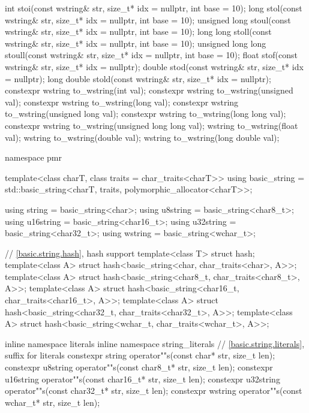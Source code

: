 \begin{codeblock}
{  int stoi(const wstring& str, size_t* idx = nullptr, int base = 10);
  long stol(const wstring& str, size_t* idx = nullptr, int base = 10);
  unsigned long stoul(const wstring& str, size_t* idx = nullptr, int base = 10);
  long long stoll(const wstring& str, size_t* idx = nullptr, int base = 10);
  unsigned long long stoull(const wstring& str, size_t* idx = nullptr, int base = 10);
  float stof(const wstring& str, size_t* idx = nullptr);
  double stod(const wstring& str, size_t* idx = nullptr);
  long double stold(const wstring& str, size_t* idx = nullptr);
  constexpr wstring to_wstring(int val);
  constexpr wstring to_wstring(unsigned val);
  constexpr wstring to_wstring(long val);
  constexpr wstring to_wstring(unsigned long val);
  constexpr wstring to_wstring(long long val);
  constexpr wstring to_wstring(unsigned long long val);
  wstring to_wstring(float val);
  wstring to_wstring(double val);
  wstring to_wstring(long double val);

  namespace pmr {
    template<class charT, class traits = char_traits<charT>>
      using basic_string = std::basic_string<charT, traits, polymorphic_allocator<charT>>;

    using string    = basic_string<char>;
    using u8string  = basic_string<char8_t>;
    using u16string = basic_string<char16_t>;
    using u32string = basic_string<char32_t>;
    using wstring   = basic_string<wchar_t>;
  }

  // \ref{basic.string.hash}, hash support
  template<class T> struct hash;
  template<class A> struct hash<basic_string<char, char_traits<char>, A>>;
  template<class A> struct hash<basic_string<char8_t, char_traits<char8_t>, A>>;
  template<class A> struct hash<basic_string<char16_t, char_traits<char16_t>, A>>;
  template<class A> struct hash<basic_string<char32_t, char_traits<char32_t>, A>>;
  template<class A> struct hash<basic_string<wchar_t, char_traits<wchar_t>, A>>;

  inline namespace literals {
    inline namespace string_literals {
      // \ref{basic.string.literals}, suffix for  literals
      constexpr string    operator""s(const char* str, size_t len);
      constexpr u8string  operator""s(const char8_t* str, size_t len);
      constexpr u16string operator""s(const char16_t* str, size_t len);
      constexpr u32string operator""s(const char32_t* str, size_t len);
      constexpr wstring   operator""s(const wchar_t* str, size_t len);
    }
  }
}
\end{codeblock}

